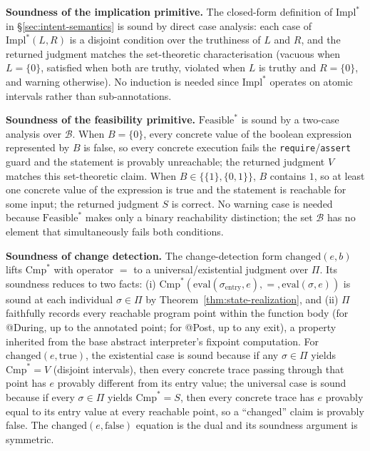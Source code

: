 \documentclass[pdflatex,sn-basic]{sn-jnl}%
\theoremstyle{thmstyleone}%
\theoremstyle{thmstyletwo}%
\theoremstyle{thmstylethree}%
\begin{document}
\smallskip
\noindent\textbf{Soundness of the implication primitive.}
The closed-form definition of $\text{Impl}^*$ in §\ref{sec:intent-semantics} is sound by direct case analysis: each case of $\text{Impl}^*(L, R)$ is a disjoint condition over the truthiness of $L$ and $R$, and the returned judgment matches the set-theoretic characterisation (vacuous when $L = \{0\}$, satisfied when both are truthy, violated when $L$ is truthy and $R = \{0\}$, and warning otherwise). No induction is needed since $\text{Impl}^*$ operates on atomic intervals rather than sub-annotations.

\smallskip
\noindent\textbf{Soundness of the feasibility primitive.}
$\text{Feasible}^*$ is sound by a two-case analysis over $\mathcal{B}$.
When $B = \{0\}$, every concrete value of the boolean expression represented by $B$ is false, so every concrete execution fails the \texttt{require}/\texttt{assert} guard and the statement is provably unreachable; the returned judgment $V$ matches this set-theoretic claim.
When $B \in \{\{1\}, \{0, 1\}\}$, $B$ contains $1$, so at least one concrete value of the expression is true and the statement is reachable for some input; the returned judgment $S$ is correct.
No warning case is needed because $\text{Feasible}^*$ makes only a binary reachability distinction; the set $\mathcal{B}$ has no element that simultaneously fails both conditions.

\smallskip
\noindent\textbf{Soundness of change detection.}
The change-detection form $\text{changed}(e, b)$ lifts $\text{Cmp}^*$ with operator $=$ to a universal/existential judgment over $\Pi$.
Its soundness reduces to two facts: (i) $\text{Cmp}^*(\text{eval}(\sigma_{\text{entry}}, e), =, \text{eval}(\sigma, e))$ is sound at each individual $\sigma \in \Pi$ by Theorem~\ref{thm:state-realization}, and (ii) $\Pi$ faithfully records every reachable program point within the function body (for @During, up to the annotated point; for @Post, up to any exit), a property inherited from the base abstract interpreter's fixpoint computation.
For $\text{changed}(e, \text{true})$, the existential case is sound because if any $\sigma \in \Pi$ yields $\text{Cmp}^* = V$ (disjoint intervals), then every concrete trace passing through that point has $e$ provably different from its entry value; the universal case is sound because if every $\sigma \in \Pi$ yields $\text{Cmp}^* = S$, then every concrete trace has $e$ provably equal to its entry value at every reachable point, so a ``changed'' claim is provably false.
The $\text{changed}(e, \text{false})$ equation is the dual and its soundness argument is symmetric.
\end{document}
